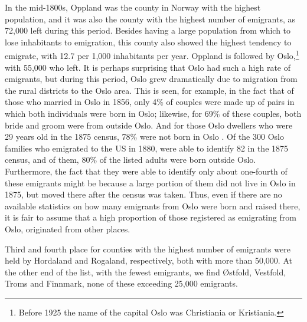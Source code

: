 \documentclass[output=paper]{langscibook}
\begin{document}
In the mid-1800s, Oppland was the county in Norway with the highest population, and it was also the county with the highest number of emigrants, as 72,000 left during this period. Besides having a large population from which to lose inhabitants to emigration, this county also showed the highest tendency to emigrate, with 12.7 per 1,000 inhabitants per year. Oppland is followed by Oslo,\footnote{Before 1925 the name of the capital Oslo was Christiania or Kristiania.} with 55,000 who left. It is perhaps surprising that Oslo had such a high rate of emigrants, but during this period, Oslo grew dramatically due to migration from the rural districts to the Oslo area. This is seen, for example, in the fact that of those who married in Oslo in 1856, only 4\% of couples were made up of pairs in which both individuals were born in Oslo; likewise, for 69\% of these couples, both bride and groom were from outside Oslo. And for those Oslo dwellers who were 29 years old in the 1875 census, 78\% were not born in Oslo \citep[206]{Myhre1990}. Of the 300 Oslo families who emigrated to the US in 1880, \citet[155ff.]{OestremRinnan1979} were able to identify 82 in the 1875 census, and of them, 80\% of the listed adults were born outside Oslo. Furthermore, the fact that they were able to identify only about one-fourth of these emigrants might be because a large portion of them did not live in Oslo in 1875, but moved there after the census was taken. Thus, even if there are no available statistics on how many emigrants from Oslo were born and raised there, it is fair to assume that a high proportion of those registered as emigrating from Oslo, originated from other places. 

Third and fourth place for counties with the highest number of emigrants were held by Hordaland and Rogaland, respectively, both with more than 50,000. At the other end of the list, with the fewest emigrants, we find Østfold, Vestfold, Troms and Finnmark, none of these exceeding 25,000 emigrants.
\end{document}
